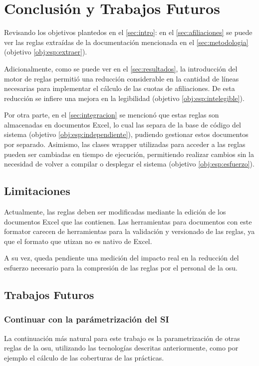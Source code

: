 \section{Conclusión y Trabajos Futuros}\label{sec:conclusiones}

Revisando los objetivos plantedos en el \cref{sec:intro}: en el \cref{sec:afiliaciones} se puede ver las reglas extraídas de la documentación mencionada en el \cref{sec:metodologia} (objetivo \ref{obj:esp:extraer}).

Adicionalmente, como se puede ver en el \cref{sec:resultados}, la introducción del motor de reglas permitió una reducción considerable en la cantidad de líneas necesarias para implementar el cálculo de las cuotas de afiliaciones. De esta reducción se infiere una mejora en la legibilidad (objetivo \ref{obj:esp:intelegible}).

Por otra parte, en el \cref{sec:integracion} se mencionó que estas reglas son almacenadas en documentos Excel, lo cual las separa de la base de código del sistema (objetivo \ref{obj:esp:independiente}), pudiendo gestionar estos documentos por separado. Asimismo, las clases wrapper utilizadas para acceder a las reglas pueden ser cambiadas en tiempo de ejecución, permitiendo realizar cambios sin la necesidad de volver a compilar o desplegar el sistema (objetivo \ref{obj:esp:esfuerzo}).

\subsection{Limitaciones}
Actualmente, las reglas deben ser modificadas mediante la edición de los documentos Excel que las contienen. Las herramientas para documentos con este formator carecen de herramientas para la validación y versionado de las reglas, ya que el formato que utizan no es nativo de Excel.

A su vez, queda pendiente una medición del impacto real en la reducción del esfuerzo necesario para la compresión de las reglas por el personal de la \acrshort{osu}.

\subsection{Trabajos Futuros}

\subsubsection{Continuar con la parámetrización del SI}
La continuación más natural para este trabajo es la parametrización de otras reglas de la \acrshort{osu}, utilizando las tecnologías descritas anteriormente, como por ejemplo el cálculo de las coberturas de las prácticas.

